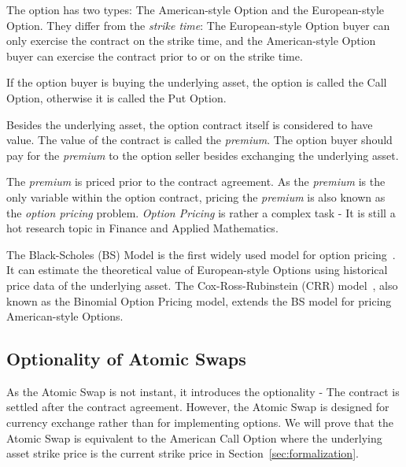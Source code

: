 The option has two types: The American-style Option and the European-style Option.
They differ from the \textit{strike time}:
The European-style Option buyer can only exercise the contract on the strike time,
and the American-style Option buyer can exercise the contract prior to or on the strike time.

If the option buyer is buying the underlying asset, the option is called the Call Option, otherwise it is called the Put Option.

Besides the underlying asset, the option contract itself is considered to have value.
The value of the contract is called the \textit{premium}.
The option buyer should pay for the \textit{premium} to the option seller besides exchanging the underlying asset.

The \textit{premium} is priced prior to the contract agreement.
As the \textit{premium} is the only variable within the option contract,
pricing the \textit{premium} is also known as the \textit{option pricing} problem.
\textit{Option Pricing} is rather a complex task - It is still a hot research topic in Finance and Applied Mathematics.

The Black-Scholes (BS) Model is the first widely used model for option pricing~\cite{black1973pricing}.
It can estimate the theoretical value of European-style Options using historical price data of the underlying asset.
The Cox-Ross-Rubinstein (CRR) model~\cite{cox1979option}, also known as the Binomial Option Pricing model, extends the BS model for pricing American-style Options.

\subsection{Optionality of Atomic Swaps}

As the Atomic Swap is not instant, it introduces the optionality - The contract is settled after the contract agreement.
However, the Atomic Swap is designed for currency exchange rather than for implementing options.
We will prove that the Atomic Swap is equivalent to the American Call Option
where the underlying asset strike price is the current strike price in Section~\ref{sec:formalization}.